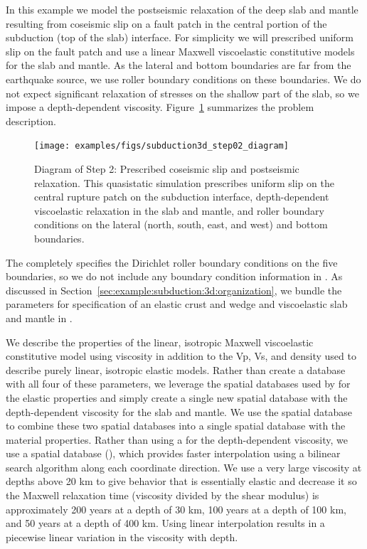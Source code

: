 In this example we model the postseismic relaxation of the deep slab
and mantle resulting from coseismic slip on a fault patch in the
central portion of the subduction (top of the slab) interface. For
simplicity we will prescribed uniform slip on the fault patch and use
a linear Maxwell viscoelastic constitutive models for the slab and
mantle. As the lateral and bottom boundaries are far from the
earthquake source, we use roller boundary conditions on these
boundaries. We do not expect significant relaxation of stresses on the
shallow part of the slab, so we impose a depth-dependent
viscosity. Figure~\ref{fig:example:subduction:3d:step02:diagram}
summarizes the problem description.

\begin{figure}[htbp]
  \texttt{[image: examples/figs/subduction3d\_step02\_diagram]}
  \caption{Diagram of Step 2: Prescribed coseismic slip and
    postseismic relaxation. This quasistatic simulation prescribes
    uniform slip on the central rupture patch on the subduction interface,
    depth-dependent viscoelastic relaxation in the slab and mantle,
    and roller boundary conditions on the lateral (north, south, east,
    and west) and bottom boundaries.}
  \label{fig:example:subduction:3d:step02:diagram}
\end{figure}

The  completely specifies the Dirichlet roller
boundary conditions on the five boundaries, so we do not include any
boundary condition information in . As discussed
in Section~\vref{sec:example:subduction:3d:organization}, we bundle
the parameters for specification of an elastic crust and wedge and
viscoelastic slab and mantle in .

We describe the properties of the linear, isotropic Maxwell
viscoelastic constitutive model using viscosity in addition to the Vp,
Vs, and density used to describe purely linear, isotropic elastic
models. Rather than create a database with all four of these
parameters, we leverage the  spatial databases used
by  for the elastic properties and simply
create a single new spatial database with the depth-dependent
viscosity for the slab and mantle. We use the 
spatial database to combine these two spatial databases into a single
spatial database with the material properties. Rather than using a
 for the depth-dependent viscosity, we use a
 spatial database
(), which provides faster
interpolation using a bilinear search algorithm along each coordinate
direction. We use a very large viscosity at depths above 20 km to give
behavior that is essentially elastic and decrease it so the Maxwell
relaxation time (viscosity divided by the shear modulus) is
approximately 200 years at a depth of 30 km, 100 years at a depth of
100 km, and 50 years at a depth of 400 km. Using linear interpolation
results in a piecewise linear variation in the viscosity with depth.

